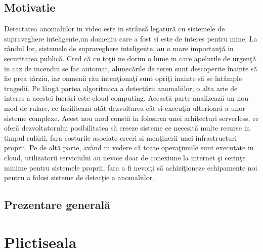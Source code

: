 \documentclass[a4paper,12pt]{report}
\begin{document}
\section{Motivatie}
Detectarea anomaliilor in video este in strânsă legatură cu sistemele de supraveghere inteligente,un domeniu care a fost si este de interes pentru mine. La rândul lor, sistemele de supraveghere inteligente, au o mare importanţă in securitatea publică. Cred că cu toţii ne dorim o lume in care apelurile de urgenţă in caz de incendiu se fac automat, alunecările de teren sunt descoperite înainte să fie prea târziu, iar oamenii rău intenţionaţi sunt opriţi inainte să se întâmple tragedii. Pe lângă partea algoritmica a detectării anomaliilor, o alta arie de interes a acestei lucrări este cloud computing. Această parte analizează un nou mod de rulare, ce facilitează atât dezvoltarea cât si execuţia ulterioară a unor sisteme complexe. Acest nou mod constă in folosirea unei arhitecturi serverless, ce oferă dezvoltatorului posibilitatea să creeze sisteme ce necesită multe resurse in timpul rulării, fara costurile asociate creeri si menţinerii unei infrastructuri proprii. Pe de altă parte, având in vedere că toate operaţiunile sunt executate in cloud, utilizatorii serviciului au nevoie doar de conexiune la internet şi cerinţe minime pentru sistemele proprii, fara a fi nevoiţi să achiziţioneze echipamente noi pentru a folosi sisteme de detecţie a anomaliilor.
\section{Prezentare generală}

\chapter{Plictiseala}
\blindtext[3]



\end{document}
